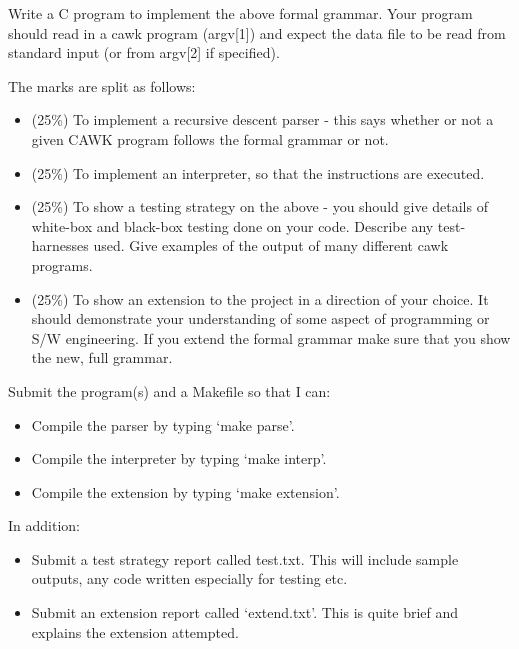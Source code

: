 



\begin{exercise}
Write a C program to implement the above formal grammar. Your program
should read in a cawk program (argv[1]) and expect the data
file to be read from standard input (or from argv[2] if specified).

The marks are split as follows:
\begin{itemize}
\item (25\%) To implement a recursive descent parser - this says
whether or not a given CAWK program follows the formal grammar or not.

\item (25\%) To implement an interpreter, so that the instructions are
executed.

\item (25\%) To show a testing strategy on the above -
you should give details of
white-box and black-box testing done on your code. Describe any
test-harnesses used. Give examples of the output of many different
cawk programs.

\item (25\%) To show an extension to the project in a direction of
your choice. It should demonstrate your understanding of some aspect
of programming or S/W engineering. If you extend the formal grammar
make sure that you show the new, full grammar.
\end{itemize}

Submit the program(s) and a Makefile so that I can:

\begin{itemize}
\item Compile the parser by typing `make parse'.
\item Compile the interpreter by typing `make interp'.
\item Compile the extension by typing `make extension'.
\end{itemize}

In addition:
\begin{itemize}
\item Submit a test strategy report called test.txt. This will include
sample outputs, any code written especially for testing etc.
\item Submit an extension report called `extend.txt'. This is quite
brief and explains the extension attempted.
\end{itemize}

\end{exercise}

